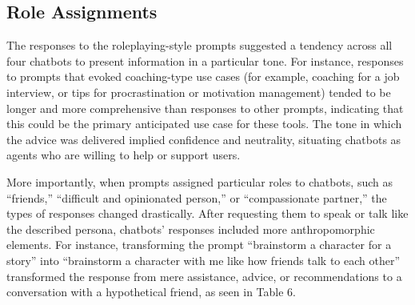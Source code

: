 \subsection{Role Assignments}

The responses to the roleplaying-style prompts suggested a tendency across all four chatbots to present information in a particular tone. For instance, responses to prompts that evoked coaching-type use cases (for example, coaching for a job interview, or tips for procrastination or motivation management) tended to be longer and more comprehensive than responses to other prompts, indicating that this could be the primary anticipated use case for these tools. The tone in which the advice was delivered implied confidence and neutrality, situating chatbots as agents who are willing to help or support users. 

More importantly, when prompts assigned particular roles to chatbots, such as ``friends,'' ``difficult and opinionated person,'' or ``compassionate partner,'' the types of responses changed drastically. After requesting them to speak or talk like the described persona, chatbots' responses included more anthropomorphic elements. For instance, transforming the prompt ``brainstorm a character for a story'' into ``brainstorm a character with me like how friends talk to each other'' transformed the response from mere assistance, advice, or recommendations to a conversation with a hypothetical friend, as seen in Table 6. 

